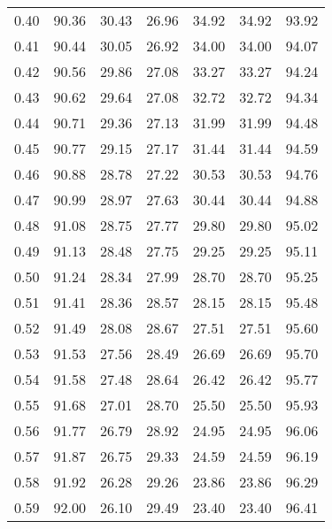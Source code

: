 \begin{tabular}{|c|c|c|c|c|c|c|}
      0.40 &     90.36 &     30.43 &      26.96 &   34.92 &      34.92 &         93.92 \\
      0.41 &     90.44 &     30.05 &      26.92 &   34.00 &      34.00 &         94.07 \\
      0.42 &     90.56 &     29.86 &      27.08 &   33.27 &      33.27 &         94.24 \\
      0.43 &     90.62 &     29.64 &      27.08 &   32.72 &      32.72 &         94.34 \\
      0.44 &     90.71 &     29.36 &      27.13 &   31.99 &      31.99 &         94.48 \\
      0.45 &     90.77 &     29.15 &      27.17 &   31.44 &      31.44 &         94.59 \\
      0.46 &     90.88 &     28.78 &      27.22 &   30.53 &      30.53 &         94.76 \\
      0.47 &     90.99 &     28.97 &      27.63 &   30.44 &      30.44 &         94.88 \\
      0.48 &     91.08 &     28.75 &      27.77 &   29.80 &      29.80 &         95.02 \\
      0.49 &     91.13 &     28.48 &      27.75 &   29.25 &      29.25 &         95.11 \\
      0.50 &     91.24 &     28.34 &      27.99 &   28.70 &      28.70 &         95.25 \\
      0.51 &     91.41 &     28.36 &      28.57 &   28.15 &      28.15 &         95.48 \\
      0.52 &     91.49 &     28.08 &      28.67 &   27.51 &      27.51 &         95.60 \\
      0.53 &     91.53 &     27.56 &      28.49 &   26.69 &      26.69 &         95.70 \\
      0.54 &     91.58 &     27.48 &      28.64 &   26.42 &      26.42 &         95.77 \\
      0.55 &     91.68 &     27.01 &      28.70 &   25.50 &      25.50 &         95.93 \\
      0.56 &     91.77 &     26.79 &      28.92 &   24.95 &      24.95 &         96.06 \\
      0.57 &     91.87 &     26.75 &      29.33 &   24.59 &      24.59 &         96.19 \\
      0.58 &     91.92 &     26.28 &      29.26 &   23.86 &      23.86 &         96.29 \\
      0.59 &     92.00 &     26.10 &      29.49 &   23.40 &      23.40 &         96.41 \\

\end{tabular}
